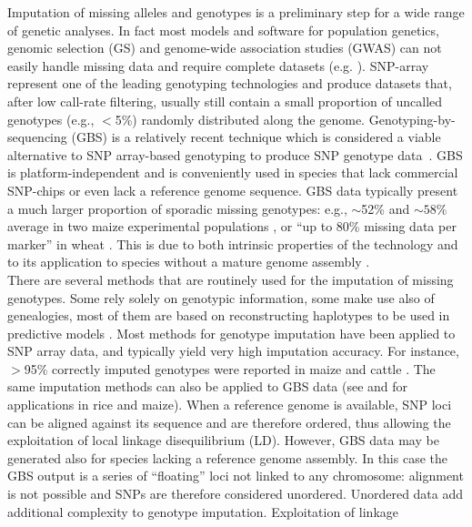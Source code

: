 Imputation of missing alleles and genotypes is a preliminary step for
a wide range of genetic analyses. In fact most models and software for 
population genetics, genomic selection (GS) and genome-wide association 
studies (GWAS) can not easily handle missing data and require complete datasets (e.g. \cite{hayes2009invited,aulchenko2007genabel,endelman2011rrblup,perez2014genome}). 
SNP-array represent one of the leading genotyping technologies and produce 
datasets that, after low call-rate filtering, 
usually still contain a small proportion of uncalled genotypes (e.g., $<$5\%) 
randomly distributed along the genome. Genotyping-by-sequencing (GBS) is a 
relatively recent technique which is considered a viable alternative to SNP array-based genotyping to produce SNP genotype data~\cite{elshire_robust_2011}.
GBS is platform-independent and is conveniently 
used in species that lack commercial SNP-chips or even lack a reference 
genome sequence. GBS data typically present a much larger proportion of 
sporadic missing genotypes: e.g., $\sim$52\% and $\sim 58\%$ average in two maize experimental populations \cite{crossa_genomic_2013},
or ``up to 80\% missing data per marker'' in wheat \cite{poland_genomic_2012}. This 
is due to both intrinsic properties of the technology
and to its application to species without a mature genome assembly \cite{glaubitz_tassel-gbs:_2014}.\\
There are several methods that are routinely used for the imputation of 
missing genotypes. Some rely solely on genotypic information, some make 
use also of genealogies, most of them are based on reconstructing haplotypes 
to be used in predictive models \cite{nicolazzi_software_2015}. Most methods for 
genotype imputation have been applied to SNP array data, and typically 
yield very high imputation accuracy. For instance, $>$95\% correctly imputed 
genotypes were reported in maize \cite{hickey_factors_2012} and cattle \cite{vanraden_genomic_2011}. 
The same imputation methods can also be applied to GBS data (see \cite{huang_efficient_2014} and \cite{swarts_novel_2014} for applications in rice and maize). When a reference 
genome is available, SNP loci can be aligned against its sequence and 
are therefore ordered, thus allowing the exploitation of local linkage disequilibrium (LD).
However, GBS data may be generated 
also for species lacking a reference genome assembly. In this case the 
GBS output is a series of ``floating'' loci not linked to any chromosome:
alignment is not possible and SNPs are therefore considered unordered. Unordered 
data add additional complexity to genotype imputation. Exploitation of linkage 
